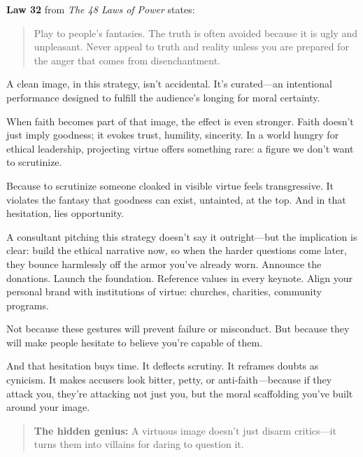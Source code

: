 \begin{tcolorbox}[colback=blue!5!white, colframe=blue!50!black, breakable, title={Psychological Sidebar: Law 32 --- Play to people's fantasies}]

\textbf{Law 32} from \textit{The 48 Laws of Power} states:

\begin{quote}
Play to people's fantasies. The truth is often avoided because it is ugly and unpleasant. Never appeal to truth and reality unless you are prepared for the anger that comes from disenchantment.
\end{quote}

A clean image, in this strategy, isn’t accidental. It’s curated—an intentional performance designed to fulfill the audience’s longing for moral certainty.

\medskip

When faith becomes part of that image, the effect is even stronger. Faith doesn’t just imply goodness; it evokes trust, humility, sincerity. In a world hungry for ethical leadership, projecting virtue offers something rare: a figure we don’t want to scrutinize.

\medskip

Because to scrutinize someone cloaked in visible virtue feels transgressive. It violates the fantasy that goodness can exist, untainted, at the top. And in that hesitation, lies opportunity.

\medskip

A consultant pitching this strategy doesn’t say it outright—but the implication is clear: build the ethical narrative now, so when the harder questions come later, they bounce harmlessly off the armor you’ve already worn. Announce the donations. Launch the foundation. Reference values in every keynote. Align your personal brand with institutions of virtue: churches, charities, community programs.

\medskip

Not because these gestures will prevent failure or misconduct. But because they will make people hesitate to believe you’re capable of them.

\medskip

And that hesitation buys time. It deflects scrutiny. It reframes doubts as cynicism. It makes accusers look bitter, petty, or anti-faith—because if they attack you, they’re attacking not just you, but the moral scaffolding you’ve built around your image.

\begin{quote}
\textbf{The hidden genius:} A virtuous image doesn’t just disarm critics—it turns them into villains for daring to question it.
\end{quote}


\end{tcolorbox}
